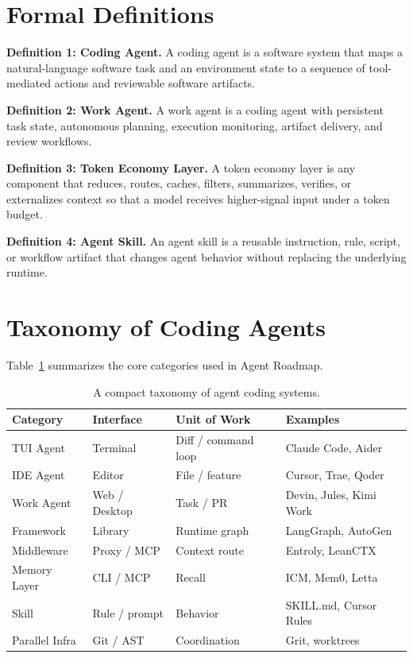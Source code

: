 \documentclass[11pt]{article}
\begin{document}
\section{Formal Definitions}
\textbf{Definition 1: Coding Agent.} A coding agent is a software system that maps a natural-language software task and an environment state to a sequence of tool-mediated actions and reviewable software artifacts.

\textbf{Definition 2: Work Agent.} A work agent is a coding agent with persistent task state, autonomous planning, execution monitoring, artifact delivery, and review workflows.

\textbf{Definition 3: Token Economy Layer.} A token economy layer is any component that reduces, routes, caches, filters, summarizes, verifies, or externalizes context so that a model receives higher-signal input under a token budget.

\textbf{Definition 4: Agent Skill.} An agent skill is a reusable instruction, rule, script, or workflow artifact that changes agent behavior without replacing the underlying runtime.

\section{Taxonomy of Coding Agents}
Table~\ref{tab:taxonomy} summarizes the core categories used in Agent Roadmap.

\begin{table}[h]
\centering
\small
\begin{tabular}{llll}
\toprule
Category & Interface & Unit of Work & Examples \\
\midrule
TUI Agent & Terminal & Diff / command loop & Claude Code, Aider \\
IDE Agent & Editor & File / feature & Cursor, Trae, Qoder \\
Work Agent & Web / Desktop & Task / PR & Devin, Jules, Kimi Work \\
Framework & Library & Runtime graph & LangGraph, AutoGen \\
Middleware & Proxy / MCP & Context route & Entroly, LeanCTX \\
Memory Layer & CLI / MCP & Recall & ICM, Mem0, Letta \\
Skill & Rule / prompt & Behavior & SKILL.md, Cursor Rules \\
Parallel Infra & Git / AST & Coordination & Grit, worktrees \\
\bottomrule
\end{tabular}
\caption{A compact taxonomy of agent coding systems.}
\label{tab:taxonomy}
\end{table}
\end{document}

